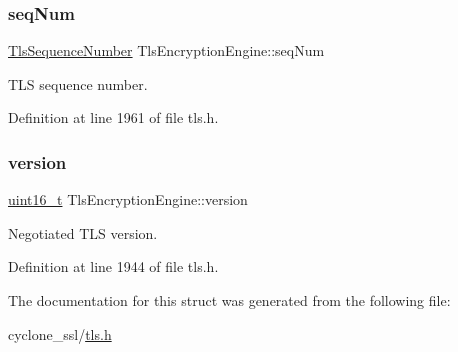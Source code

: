 \subsubsection{\texorpdfstring{seq\+Num}{seqNum}}
{\footnotesize\ttfamily \hyperlink{tls_8h_aadbcbb634b990da0c6d0d07fe08e9f89}{Tls\+Sequence\+Number} Tls\+Encryption\+Engine\+::seq\+Num}



T\+LS sequence number. 



Definition at line 1961 of file tls.\+h.

\mbox{\label{structTlsEncryptionEngine_aa340a0b969c2b0f795556e66a68fae27}} 
\subsubsection{\texorpdfstring{version}{version}}
{\footnotesize\ttfamily \hyperlink{stdint_8h_a273cf69d639a59973b6019625df33e30}{uint16\+\_\+t} Tls\+Encryption\+Engine\+::version}



Negotiated T\+LS version. 



Definition at line 1944 of file tls.\+h.



The documentation for this struct was generated from the following file\+:\begin{DoxyCompactItemize}
\item 
cyclone\+\_\+ssl/\hyperlink{tls_8h}{tls.\+h}\end{DoxyCompactItemize}
